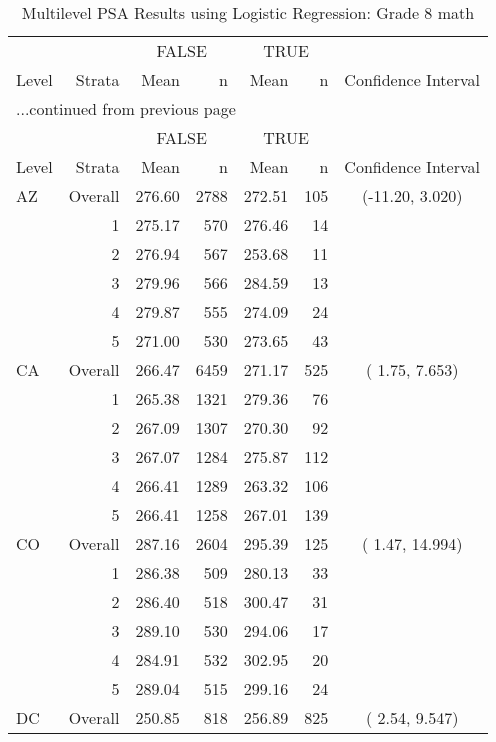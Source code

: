 \begin{longtable}{lrrr@{\extracolsep{.25cm}}rrc}
\caption{Multilevel PSA Results using Logistic Regression: Grade 8 math} \\ 
   \hline & & \multicolumn{2}{c}{FALSE} & \multicolumn{2}{c}{TRUE} & \\ \cline{3-4} \cline{5-6} Level & Strata & Mean & n & Mean & n & Confidence Interval \\ \hline\endfirsthead \multicolumn{7}{l}{{...continued from previous page}}\\ \hline  & & \multicolumn{2}{c}{FALSE} & \multicolumn{2}{c}{TRUE} & \\ \cline{3-4} \cline{5-6} Level & Strata & Mean & n & Mean & n & Confidence Interval \\ \hline \endhead \endfoot \endlastfoot  \hline
AZ & Overall & 276.60 & 2788 & 272.51 & 105 & (-11.20,   3.020) \\ 
   & 1 & 275.17 & 570 & 276.46 &  14 &  \\ 
   & 2 & 276.94 & 567 & 253.68 &  11 &  \\ 
   & 3 & 279.96 & 566 & 284.59 &  13 &  \\ 
   & 4 & 279.87 & 555 & 274.09 &  24 &  \\ 
   & 5 & 271.00 & 530 & 273.65 &  43 &  \\ 
   \hline
CA & Overall & 266.47 & 6459 & 271.17 & 525 & (  1.75,   7.653) \\ 
   & 1 & 265.38 & 1321 & 279.36 &  76 &  \\ 
   & 2 & 267.09 & 1307 & 270.30 &  92 &  \\ 
   & 3 & 267.07 & 1284 & 275.87 & 112 &  \\ 
   & 4 & 266.41 & 1289 & 263.32 & 106 &  \\ 
   & 5 & 266.41 & 1258 & 267.01 & 139 &  \\ 
   \hline
CO & Overall & 287.16 & 2604 & 295.39 & 125 & (  1.47,  14.994) \\ 
   & 1 & 286.38 & 509 & 280.13 &  33 &  \\ 
   & 2 & 286.40 & 518 & 300.47 &  31 &  \\ 
   & 3 & 289.10 & 530 & 294.06 &  17 &  \\ 
   & 4 & 284.91 & 532 & 302.95 &  20 &  \\ 
   & 5 & 289.04 & 515 & 299.16 &  24 &  \\ 
   \hline
DC & Overall & 250.85 & 818 & 256.89 & 825 & (  2.54,   9.547) \\ 

\end{longtable}

